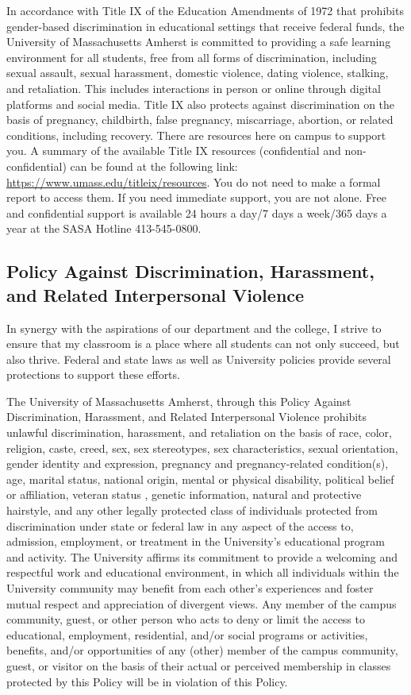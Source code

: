 \documentclass[11pt,twoside]{article}
\numberwithin{equation}{section}
\newcommand{\?}{\stackrel{?}{=}}
\begin{document}
In accordance with Title IX of the Education Amendments of 1972 that prohibits gender-based discrimination in educational settings that receive federal funds, the University of Massachusetts Amherst is committed to providing a safe learning environment for all students, free from all forms of discrimination, including sexual assault, sexual harassment, domestic violence, dating violence, stalking, and retaliation. This includes interactions in person or online through digital platforms and social media. Title IX also protects against discrimination on the basis of pregnancy, childbirth, false pregnancy, miscarriage, abortion, or related conditions, including recovery. There are resources here on campus to support you. A summary of the available Title IX resources (confidential and non-confidential) can be found at the following link: 
\url{https://www.umass.edu/titleix/resources}. You do not need to make a formal report to access them. If you need immediate support, you are not alone. Free and confidential support is available 24 hours a day/7 days a week/365 days a year at the SASA Hotline 413-545-0800.



\subsection{Policy Against Discrimination, Harassment, and Related Interpersonal Violence}

In synergy with the aspirations of our department and the college, I strive to ensure that my classroom is a place where all students can not only succeed, but also thrive. Federal and state laws as well as University policies provide several protections to support these efforts. 

The University of Massachusetts Amherst, through this Policy Against Discrimination, Harassment, and Related Interpersonal Violence prohibits unlawful discrimination, harassment, and retaliation on the basis of race, color, religion, caste, creed, sex, sex stereotypes, sex characteristics, sexual orientation, gender identity and expression, pregnancy and pregnancy-related condition(s), age, marital status, national origin, mental or physical disability, political belief or affiliation, veteran status , genetic information, natural and protective hairstyle, and any other legally protected class of individuals protected from discrimination under state or federal law in any aspect of the access to, admission, employment, or treatment in the University's educational program and activity. The University affirms its commitment to provide a welcoming and respectful work and educational environment, in which all individuals within the University community may benefit from each other's experiences and foster mutual respect and appreciation of divergent views. Any member of the campus community, guest, or other person who acts to deny or limit the access to educational, employment, residential, and/or social programs or activities, benefits, and/or opportunities of any (other) member of the campus community, guest, or visitor on the basis of their actual or perceived membership in classes protected by this Policy will be in violation of this Policy.
\end{document}
